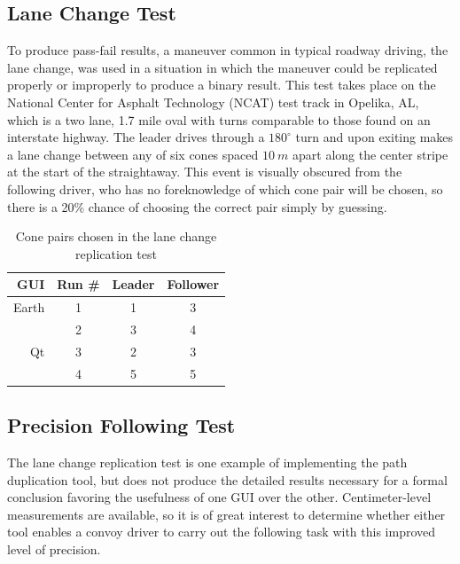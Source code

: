 \documentclass[twocolumn,10pt]{article}
\begin{document}
  \subsection*{Lane Change Test}

    To produce pass-fail results, a maneuver common in typical roadway driving, the lane change, was used in a situation in which the maneuver could be replicated properly or improperly to produce a binary result.  This test takes place on the National Center for Asphalt Technology (NCAT) test track in Opelika, AL, which is a two lane, 1.7 mile oval with turns comparable to those found on an interstate highway.  The leader drives through a $180^{\circ}$ turn and upon exiting makes a lane change between any of six cones spaced $10~m$ apart along the center stripe at the start of the straightaway.  This event is visually obscured from the following driver, who has no foreknowledge of which cone pair will be chosen, so there is a 20\% chance of choosing the correct pair simply by guessing.

    \begin{table}[htbp] \centering
      \caption{Cone pairs chosen in the lane change replication test}
      \begin{tabular}{rc|cc} 
        GUI&    Run \#  &     Leader&    Follower \\\hline\hline
        Earth&      1       &       1   &    3 \\
             &      2       &       3   &    4 \\ \hline
        Qt   &      3       &       2   &    3 \\
             &      4       &       5   &    5 \\ \hline   
      \end{tabular}
      \label{tab:lanechangeresults}
    \end{table}



  \subsection*{Precision Following Test}

    The lane change replication test is one example of implementing the path duplication tool, but does not produce the detailed results necessary for a formal conclusion favoring the usefulness of one GUI over the other.  Centimeter-level measurements are available, so it is of great interest to determine whether either tool enables a convoy driver to carry out the following task with this improved level of precision.
    
\end{document}
